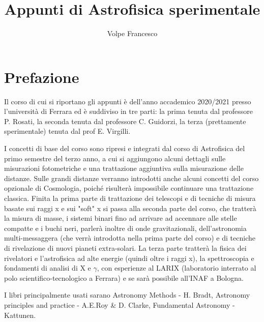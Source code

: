 \documentclass[a4paper,twoside,openany,notitlepage]{book}
\newcommand{\mail}[1]{\href{mailto:#1}{\nolinkurl{#1}}}
\theoremstyle{definition}
\theoremstyle{plain}
\begin{document}
\frontmatter
\author{Volpe Francesco}
\title{Appunti di Astrofisica sperimentale}
\date{}
\maketitle

\pagestyle{plain}
\tableofcontents

\chapter*{Prefazione}

Il corso di cui si riportano gli appunti è dell'anno accademico 2020/2021 presso l'università di Ferrara ed è suddiviso in tre parti: la prima tenuta dal professore P. Rosati, la seconda tenuta dal professore C. Guidorzi, la terza (prettamente sperimentale) tenuta dal prof E. Virgilli.

I concetti di base del corso sono ripresi e integrati dal corso di Astrofisica del primo semestre del terzo anno, a cui si aggiungono alcuni dettagli sulle misurazioni fotometriche e una trattazione aggiuntiva sulla misurazione delle distanze. Sulle grandi distanze verranno introdotti anche alcuni concetti del corso opzionale di Cosmologia, poiché risulterà impossibile continuare una trattazione classica. Finita la prima parte di trattazione dei telescopi e di tecniche di misura basate sui raggi x e sui "soft" x si passa alla seconda parte del corso, che tratterà la misura di masse, i sistemi binari fino ad arrivare ad accennare alle stelle compatte e i buchi neri, parlerà inoltre di onde gravitazionali, dell'astronomia multi-messaggera (che verrà introdotta nella prima parte del corso) e di tecniche di rivelazione di nuovi pianeti extra-solari. La terza parte tratterà la fisica dei rivelatori e l'astrofisica ad alte energie (quindi oltre i raggi x), la spettroscopia e fondamenti di analisi di X e $\gamma$, con esperienze al LARIX (laboratorio interrato al polo scientifico-tecnologico a Ferrara) e se sarà possibile all'INAF a Bologna.

I libri principalmente usati sarano Astronomy Methods - H. Bradt, Astronomy principles and practice - A.E.Roy \& D. Clarke, Fundamental Astronomy - Kattunen.

\mainmatter




\end{document}
